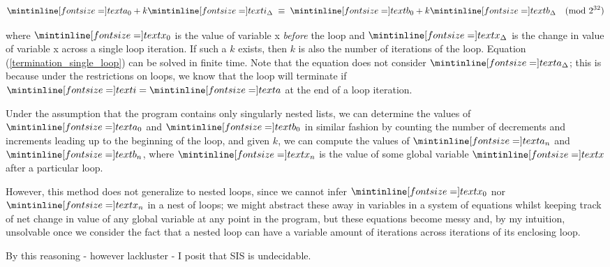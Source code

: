 \begin{align}
\ms a_0 + k \ms i_\Delta \;\equiv\; \ms b_0 + k  \ms
  b_\Delta \quad(\text{mod } 2^{32})\label{termination_single_loop}
\end{align}

where $\ms x_0$ is the value of variable \ms x \emph{before} the loop and $\ms
x_\Delta$ is the change in value of variable \ms x across a single loop
iteration. If such a $k$ exists, then $k$ is also the number of iterations of
the loop. Equation (\ref{termination_single_loop}) can be solved in finite time.
Note that the equation does not consider $\ms a_\Delta$; this is because under
the restrictions on loops, we know that the loop will terminate if $\ms i = \ms
a$ at the end of a loop iteration.

\medskip

Under the assumption that the program contains only singularly nested lists, we
can determine the values of $\ms a_0$ and $\ms b_0$ in similar fashion by
counting the number of decrements and increments leading up to the beginning of
the loop, and given $k$, we can compute the values of $\ms a_n$ and $\ms b_n$,
where $\ms x_n$ is the value of some global variable $\ms x$ after a
particular loop.

\bigskip

However, this method does not generalize to nested loops, since we cannot infer
$\ms x_0$ nor  $\ms x_n$ in a nest of loops; we might abstract these away in
variables in a system of equations whilst keeping track of net change in value
of any global variable at any point in the program, but these equations become
messy and, by my intuition, unsolvable once we consider the fact that a nested
loop can have a variable amount of iterations across iterations of its enclosing
loop.

\smallskip

By this reasoning - however lackluster - I posit that SIS is undecidable.

\Sectend
